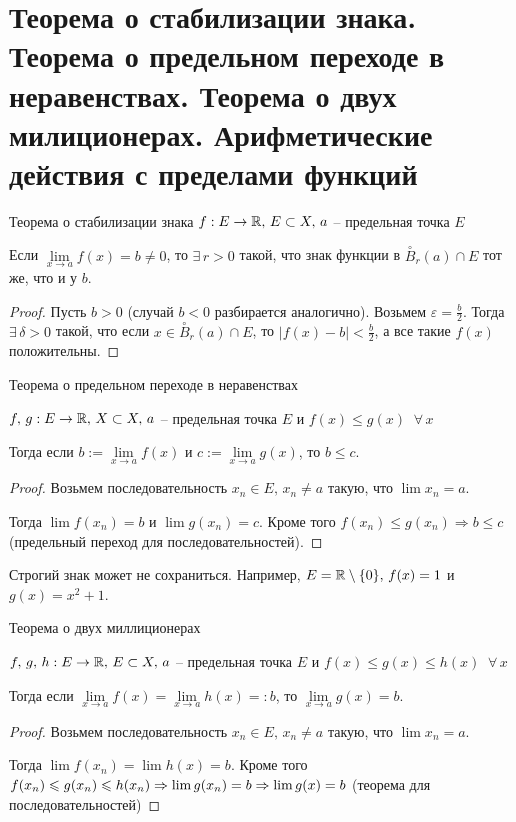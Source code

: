 \section{Теорема о стабилизации знака. Теорема о предельном переходе в неравенствах. Теорема о двух милиционерах. Арифметические действия с пределами функций}

\begin{theorem-non}
    Теорема о стабилизации знака
$f : E \to \mathbb{R}, \, E \subset X, \, a$ -- предельная точка $E$

Если $\lim\limits_{x \to a} f(x) = b \neq 0$, то $\exists \, r > 0$ такой, что знак функции в $\overset{\circ}{B}_r(a) \cap E$ тот же, что и у $b$.
\end{theorem-non}
\begin{proof}
    Пусть $b > 0$ (случай $b < 0$ разбирается аналогично). Возьмем $\varepsilon = \frac{b}{2}$. 
    Тогда $\exists \, \delta > 0$ такой, что если $x \in \overset{\circ}{B}_r(a) \cap E$, то $|f(x) - b| < \frac{b}{2}$,
    а все такие $f(x)$ положительны.
\end{proof}

\begin{theorem-non}
    Теорема о предельном переходе в неравенствах

    $f, \, g : E \to \mathbb{R}, \, X \subset X, \, a$ -- предельная точка $E$ и $f(x) \leqslant g(x) \;\; \forall \, x$

    Тогда если $b := \lim\limits_{x \to a} f(x)$ и $c := \lim\limits_{x \to a} g(x)$, то $b \leqslant c$.
\end{theorem-non}
\begin{proof}
    Возьмем последовательность $x_n \in E, \, x_n \neq a$ такую, что $\lim x_n = a$. 

    Тогда $\lim f(x_n) = b$ и $\lim g(x_n) = c$. Кроме того $f(x_n) \leqslant g(x_n) \Rightarrow b \leqslant c$ (предельный переход для последовательностей).
\end{proof}
\begin{notice}
    Строгий знак может не сохраниться. Например, $E = \mathbb{R} \setminus \{0\}, \, f(x) = 1$ и $g(x) = x^2 + 1$.
\end{notice}

\begin{theorem-non}
    Теорема о двух миллиционерах

    $f, \, g, \, h : E \to \mathbb{R}, \, E \subset X, \, a$ -- предельная точка $E$ и $f(x) \leqslant g(x) \leqslant h(x) \;\; \forall \, x$

    Тогда если $\lim\limits_{x \to a} f(x) = \lim\limits_{x \to a} h(x) =: b$, то $\lim\limits_{x \to a} g(x) = b$.
\end{theorem-non}
\begin{proof}
    Возьмем последовательность $x_n \in E, \, x_n \neq a$ такую, что $\lim x_n = a$. 

    Тогда $\lim f(x_n) = \lim h(x) = b$. Кроме того $f(x_n) \leqslant g(x_n) \leqslant h(x_n) \Rightarrow \lim g(x_n) = b \\ \Rightarrow \lim g(x) = b$
    (теорема для последовательностей)
\end{proof}


